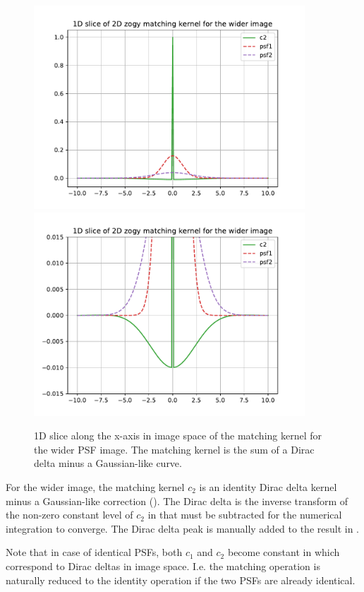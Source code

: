 \documentclass[11pt]{article}
\begin{document}
\begin{figure}
\begin{center}
\includegraphics[width=4in]{fig/zogy_theo_Gaussians_img_c2.pdf}\,
\includegraphics[width=4in]{fig/zogy_theo_Gaussians_img_c2_tails.pdf}
\end{center}
\caption{\label{fig:theo_Gaussians_img_c2}1D slice along the x-axis in image
  space of the matching kernel for the wider PSF image. The matching kernel
 is the sum of a Dirac delta minus a Gaussian-like curve.}
\end{figure}
%
\par For the wider image, the matching kernel \(c_2\) is an identity Dirac
delta kernel minus a Gaussian-like correction
(). The Dirac delta is the inverse transform
of the non-zero constant level of \(c_2\) in 
that must be subtracted for the numerical integration to converge. The Dirac
delta peak is manually added to the result in .
%
\par Note that in case of identical PSFs, both \(c_1\) and \(c_2\) become
constant in  which correspond to Dirac deltas in
image space. I.e. the matching operation is naturally reduced to the
identity operation if the two PSFs are already identical.
%
\clearpage
%
\end{document}
